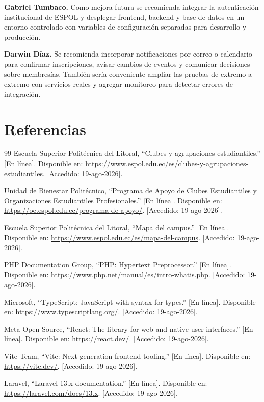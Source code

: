 \documentclass[12pt]{article}
\begin{document}
\textbf{Gabriel Tumbaco.} Como mejora futura se recomienda integrar la
autenticación institucional de ESPOL y desplegar frontend, backend y base de
datos en un entorno controlado con variables de configuración separadas para
desarrollo y producción.

\textbf{Darwin Díaz.} Se recomienda incorporar notificaciones por correo o
calendario para confirmar inscripciones, avisar cambios de eventos y comunicar
decisiones sobre membresías. También sería conveniente ampliar las pruebas de
extremo a extremo con servicios reales y agregar monitoreo para detectar
errores de integración.

\section{Referencias}
\begin{thebibliography}{99}
 Escuela Superior Politécnica del Litoral, ``Clubes y agrupaciones estudiantiles.'' [En línea]. Disponible en: \url{https://www.espol.edu.ec/es/clubes-y-agrupaciones-estudiantiles}. [Accedido: 19-ago-2026].

 Unidad de Bienestar Politécnico, ``Programa de Apoyo de Clubes Estudiantiles y Organizaciones Estudiantiles Profesionales.'' [En línea]. Disponible en: \url{https://oe.espol.edu.ec/programa-de-apoyo/}. [Accedido: 19-ago-2026].

 Escuela Superior Politécnica del Litoral, ``Mapa del campus.'' [En línea]. Disponible en: \url{https://www.espol.edu.ec/es/mapa-del-campus}. [Accedido: 19-ago-2026].

 PHP Documentation Group, ``PHP: Hypertext Preprocessor.'' [En línea]. Disponible en: \url{https://www.php.net/manual/es/intro-whatis.php}. [Accedido: 19-ago-2026].

 Microsoft, ``TypeScript: JavaScript with syntax for types.'' [En línea]. Disponible en: \url{https://www.typescriptlang.org/}. [Accedido: 19-ago-2026].

 Meta Open Source, ``React: The library for web and native user interfaces.'' [En línea]. Disponible en: \url{https://react.dev/}. [Accedido: 19-ago-2026].

 Vite Team, ``Vite: Next generation frontend tooling.'' [En línea]. Disponible en: \url{https://vite.dev/}. [Accedido: 19-ago-2026].

 Laravel, ``Laravel 13.x documentation.'' [En línea]. Disponible en: \url{https://laravel.com/docs/13.x}. [Accedido: 19-ago-2026].


\end{thebibliography}
\end{document}
